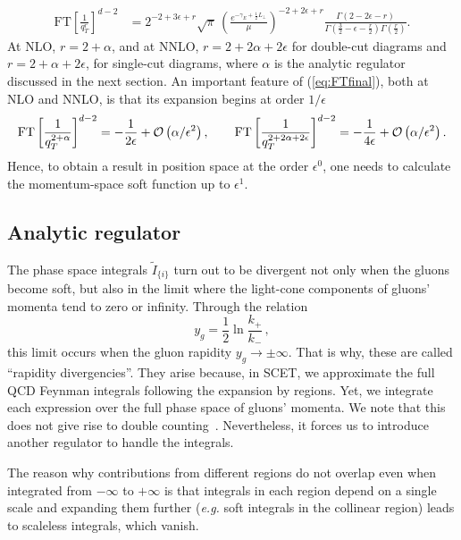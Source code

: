 \documentclass[a4paper,11pt]{article}
\newcommand{\eg}{{\it e.g. }}
\newcommand{\LT}{L_\perp}
\newcommand{\order}[1]{{{\cal O}\left(#1\right)}}
\numberwithin{equation}{section}
\begin{document}
%
\begin{align}
  \text{FT}\left[\frac{1}{q_T^r}\right]^{d-2} 
   & =
   2^{-2 + 3\epsilon + r}
   \sqrt{\pi}\,
   \left(\frac{e^{-\gamma_E+\frac12\LT}}{\mu}\right)^{-2+2\epsilon+r}
   \!\!\!\!\!\!
   \frac{\Gamma(2-2\epsilon-r)}{
   \Gamma\left(\frac{3}{2}- \epsilon -\frac{r}{2}\right)
   \Gamma\left(\frac{r}{2}\right)}.
   \label{eq:FTfinal}
\end{align}
% 
At NLO, $r=2+\alpha$, and at NNLO, $r=2+2\alpha+2\epsilon$ for double-cut
diagrams and $r=2+\alpha+2\epsilon$, for single-cut diagrams, where $\alpha$ is
the analytic regulator discussed in the next section. An important feature of
(\ref{eq:FTfinal}), both at NLO and NNLO, is that its expansion begins at
order $1/\epsilon$ 
%
\begin{equation}
  \text{FT}\left[\frac{1}{q_T^{2+\alpha}}\right]^{d-2}  = 
  -\frac{1}{2\epsilon} + \order{\alpha/\epsilon^2}\,,
  \qquad
  \text{FT}\left[\frac{1}{q_T^{2+2\alpha+2\epsilon}}\right]^{d-2}   =
  -\frac{1}{4\epsilon} + \order{\alpha/\epsilon^2}\,.
  \label{eq:FTexpand}
\end{equation}
%
Hence, to obtain a result in position space at the order
$\epsilon^0$, one needs to calculate the momentum-space soft function up to
$\epsilon^1$.


\subsection{Analytic regulator}

The phase space integrals $\tilde I_{\{i\}}$ turn out to be divergent not only
when the gluons become soft, but also in the limit where the light-cone
components of gluons' momenta tend to zero or infinity. Through the relation
%
\begin{equation}
  y_g = \frac12 \ln \frac{k_+}{k_-}\,,
\end{equation}
%
this limit occurs when the gluon rapidity $y_g \to \pm \infty$. That is why,
these are called ``rapidity divergencies''. They arise because, in SCET, we
approximate the full QCD Feynman integrals following the expansion by regions.
Yet, we integrate each expression over the full phase space of gluons' momenta.
We note that this does not give rise to double counting~\cite{Becher:2014oda}.
Nevertheless, it forces us to introduce another regulator to handle the
integrals.

The reason why contributions from different regions do not overlap even when
integrated from $-\infty$ to $+\infty$ is that integrals in each region depend
on a single scale and expanding them further (\eg soft integrals in the
collinear region) leads to scaleless integrals, which vanish.
\end{document}
